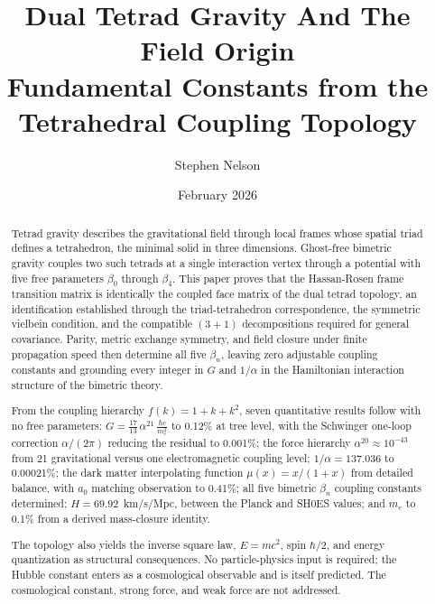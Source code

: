 \documentclass[aps,prd,preprint,superscriptaddress,showpacs,preprintnumbers,amsmath,amssymb,nofootinbib]{revtex4-2}
\begin{document}
\raggedbottom

\vspace*{3cm}

\title{Dual Tetrad Gravity And The Field Origin\\
\large Fundamental Constants from the Tetrahedral Coupling Topology}

\author{Stephen Nelson}

\date{February 2026}

\begin{abstract}
Tetrad gravity describes the gravitational field through local frames whose spatial triad defines a tetrahedron, the minimal solid in three dimensions. Ghost-free bimetric gravity couples two such tetrads at a single interaction vertex through a potential with five free parameters $\beta_0$ through $\beta_4$. This paper proves that the Hassan-Rosen frame transition matrix is identically the coupled face matrix of the dual tetrad topology, an identification established through the triad-tetrahedron correspondence, the symmetric vielbein condition, and the compatible $(3{+}1)$ decompositions required for general covariance. Parity, metric exchange symmetry, and field closure under finite propagation speed then determine all five $\beta_n$, leaving zero adjustable coupling constants and grounding every integer in $G$ and $1/\alpha$ in the Hamiltonian interaction structure of the bimetric theory.

From the coupling hierarchy $f(k) = 1 + k + k^2$, seven quantitative results follow with no free parameters: $G = \frac{17}{13}\,\alpha^{21}\,\frac{\hbar c}{m_e^2}$ to 0.12\% at tree level, with the Schwinger one-loop correction $\alpha/(2\pi)$ reducing the residual to 0.001\%; the force hierarchy $\alpha^{20} \approx 10^{-43}$ from 21 gravitational versus one electromagnetic coupling level; $1/\alpha = 137.036$ to 0.00021\%; the dark matter interpolating function $\mu(x) = x/(1+x)$ from detailed balance, with $a_0$ matching observation to 0.41\%; all five bimetric $\beta_n$ coupling constants determined; $H = 69.92$~km/s/Mpc, between the Planck and SH0ES values; and $m_e$ to 0.1\% from a derived mass-closure identity.

The topology also yields the inverse square law, $E = mc^2$, spin $\hbar/2$, and energy quantization as structural consequences. No particle-physics input is required; the Hubble constant enters as a cosmological observable and is itself predicted. The cosmological constant, strong force, and weak force are not addressed.
\end{abstract}
\end{document}
